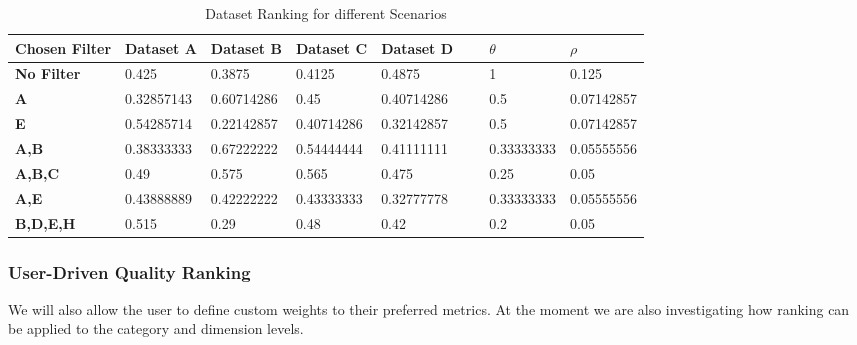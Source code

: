 \begin{table}[tbph]
    \begin{tabular}{|l|l|l|l|l|l|l|l|}
    \hline
    \textbf{Chosen Filter} & \textbf{Dataset A}                                 & \textbf{Dataset B}                                 & \textbf{Dataset C}  & \textbf{Dataset D}                                  & ~ & $\theta$ & $\rho$ \\  \hline
     \textbf{No Filter}     & 0.425                                     & 0.3875                                    & 0.4125     &      \cellcolor{blue!25} 0.4875 & ~ & 1                   & 0.125             \\  \hline
     \textbf{A}             & 0.32857143                                & \cellcolor{blue!25} 0.60714286 & 0.45       & 0.40714286                                 & ~ & 0.5                 & 0.07142857        \\  \hline
    \textbf{E}             & \cellcolor{blue!25} 0.54285714 & 0.22142857                                & 0.40714286 & 0.32142857                                 & ~ & 0.5                 & 0.07142857        \\  \hline
     \textbf{A,B}           & 0.38333333                                & \cellcolor{blue!25} 0.67222222 & 0.54444444 & 0.41111111                                 & ~ & 0.33333333          & 0.05555556        \\  \hline
    \textbf{A,B,C}         & 0.49                                      & \cellcolor{blue!25} 0.575      & 0.565      & 0.475                                      & ~ & 0.25                & 0.05              \\  \hline
    \textbf{A,E}           & \cellcolor{blue!25} 0.43888889 & 0.42222222                                & 0.43333333 & 0.32777778                                 & ~ & 0.33333333          & 0.05555556        \\  \hline
    \textbf{B,D,E,H}       & \cellcolor{blue!25} 0.515      & 0.29                                      & 0.48       & 0.42                                       & ~ & 0.2                 & 0.05              \\  \hline
    \end{tabular}
    \caption{Dataset Ranking for different Scenarios}
    \label{tbl:dataset_ranking}
\end{table}

\subsubsection{User-Driven Quality Ranking}
We will also allow the user to define custom weights to their preferred metrics.
At the moment we are also investigating how ranking can be applied to the category and dimension levels.


